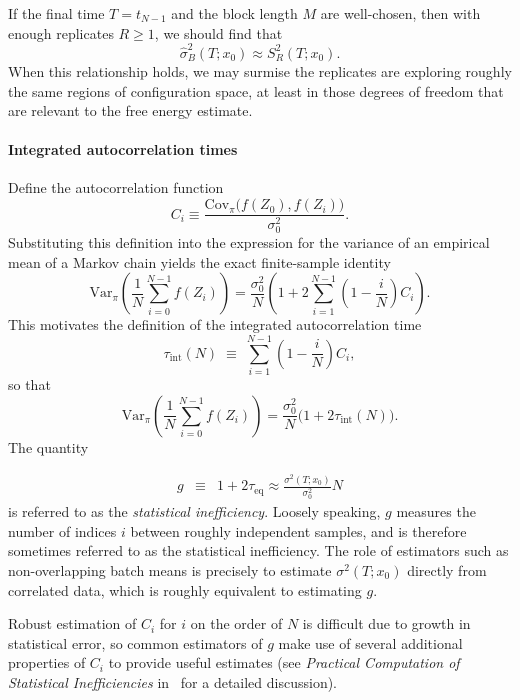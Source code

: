 \documentclass[9pt,bestpractices]{livecoms}
\begin{document}
If the final time $T=t_{N-1}$ and the block length $M$ are well-chosen, then with enough replicates $R\geqslant 1$, we should find that
$$ \hat\sigma_B^2(T; x_0) \approx S_R^2(T ; x_0) .$$
When this relationship holds, we may surmise the replicates are exploring roughly the same regions of configuration space, at least in those degrees of freedom that are relevant to the free energy estimate. 

\paragraph{Integrated autocorrelation times}

Define the autocorrelation function 
\begin{equation}
C_i \equiv
\frac{\mathrm{Cov}_{\pi}\!\bigl(f(Z_0), f(Z_i)\bigr)}{\sigma_0^2}.
\label{equation:autocorrelation-definition}
\end{equation}
Substituting this definition into the expression for the variance of an empirical mean of a Markov chain yields the exact finite-sample identity
\begin{equation}
\mathrm{Var}_{\pi}\!\left(\frac{1}{N}\sum_{i=0}^{N-1} f(Z_i) \right)
=
\frac{\sigma_0^2}{N}
\left(
1 + 2\sum_{i=1}^{N-1}\left(1-\frac{i}{N}\right) C_i
\right).
\end{equation}
This motivates the definition of the integrated autocorrelation time
\begin{equation}
\tau_{\mathrm{int}}(N)
\;\equiv\;
\sum_{i=1}^{N-1}\left(1-\frac{i}{N}\right) C_i,
\label{eq:integrated-autocorrelation-time-definition}
\end{equation}
so that
\[
\mathrm{Var}_{\pi}\!\left(\frac{1}{N}\sum_{i=0}^{N-1} f(Z_i) \right)
= \frac{\sigma_0^2}{N}\bigl(1+2\tau_{\mathrm{int}}(N)\bigr).
\]
The quantity 

\begin{eqnarray}
g &\equiv& 1 + 2 \tau_\mathrm{eq} \approx  \frac{\sigma^2(T;x_0)}{\sigma_0^2} N \label{eq:statistical-inefficiency-definition} 
\end{eqnarray}
is referred to as the \textit{statistical inefficiency}. Loosely speaking, $g$ measures the number of indices $i$ between roughly independent samples, and is therefore sometimes referred to as the statistical inefficiency. The role of estimators such as non-overlapping batch means is precisely to estimate $\sigma^2(T;x_0)$ directly from correlated data, which is roughly equivalent to estimating $g$. 

Robust estimation of $C_i$ for $i$ on the order of $N$ is difficult due to growth in statistical error, so common estimators of $g$ make use of several additional properties of $C_i$ to provide useful estimates (see \emph{Practical Computation of Statistical Inefficiencies} in~\cite{chodera2016simple} for a detailed discussion).
\end{document}
